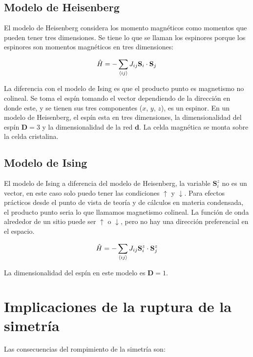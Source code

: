 \documentclass[11pt,fleqn]{book}
\renewcommand{\vec}[1]{\mathbf{#1}}
\begin{document}
\subsection{Modelo de Heisenberg}

El modelo de Heisenberg considera los momento magnéticos como momentos que pueden tener tres dimensiones. Se tiene lo que se llaman los espinores porque los espinores son momentos magnéticos en tres dimensiones:

\begin{equation}
    \hat{H}=-\sum_{\braket{ij}}J_{ij}\vec{S}_{i}\cdot\vec{S}_{j}
    \label{Eq. H}
\end{equation}

La diferencia con el modelo de Ising es que el producto punto es magnetismo no colineal. Se toma el espín tomando el vector dependiendo de la dirección en donde este, y se tienen sus tres componentes ($x$, $y$, $z$), es un espinor. En un modelo de Heisenberg, el espín esta en tres dimensiones, la dimensionalidad del espín $\vec{D}=3$ y la dimensionalidad de la red $\vec{d}$. La celda magnética se monta sobre la celda cristalina.

\subsection{Modelo de Ising}

El modelo de Ising a diferencia del modelo de Heisenberg, la variable $\vec{S}_{i}^{z}$ no es un vector, en este caso solo puedo tener las condiciones $\uparrow$ y $\downarrow$. Para efectos prácticos desde el punto de vista de teoría y de cálculos en materia condensada, el producto punto seria lo que llamamos magnetismo colineal. La función de onda alrededor de un sitio puede ser $\uparrow$ o $\downarrow$, pero no hay una dirección preferencial en el espacio. 

\begin{equation}
    \hat{H}=-\sum_{\braket{ij}}J_{ij}\vec{S}_{i}^{z}\cdot\vec{S}_{j}^{z}
    \label{Eq. I}
\end{equation}

La dimensionalidad del espín en este modelo es $\vec{D}=1$.

\section{Implicaciones de la ruptura de la simetría}

Las consecuencias del rompimiento de la simetría son:
\end{document}
